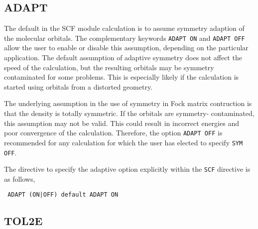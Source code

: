 \subsection{ADAPT}
\label{sec:adapt}

The default in the SCF module calculation is to assume symmetry adaption
of the molecular orbitals.  The complementary keywords \verb+ADAPT ON+
and \verb+ADAPT OFF+ allow the user to enable or disable this assumption,
depending on the particular application.  The default assumption of
adaptive symmetry does not affect the speed of the calculation, but the
resulting orbitals may be symmetry contaminated for some problems.  This
is especially likely if the calculation is started using orbitals
from a distorted geometry.

The underlying assumption in the use of symmetry in Fock matrix contruction
is that the density is totally symmetric.  If the orbitals are symmetry-
contaminated, this assumption may not be valid.  This could result in
incorrect energies and poor convergence of the calculation.  Therefore,
the option \verb+ADAPT OFF+ is recommended for any calculation for which
the user has elected to specify \verb+SYM OFF+.


The directive to specify the adaptive option explicitly within the
\verb+SCF+ directive is as follows,

\begin{verbatim}
 ADAPT (ON|OFF) default ADAPT ON
\end{verbatim}


\subsection{TOL2E}

